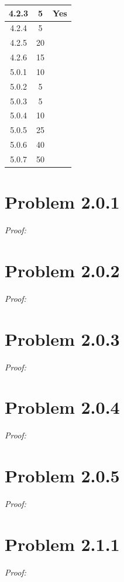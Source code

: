 \documentclass[11pt]{article}
\theoremstyle{definition}
\theoremstyle{remark}
\theoremstyle{problem}
\begin{document}
\begin{center}
\begin{tabular}{|c|c|c|}
4.2.3 & 5 & Yes \\\hline
4.2.4 & 5 & \\\hline
4.2.5 & 20 & \\\hline
4.2.6 & 15 & \\\hline
5.0.1 & 10 & \\\hline
5.0.2 & 5 & \\\hline
5.0.3 & 5 & \\\hline
5.0.4 & 10 & \\\hline
5.0.5 & 25 & \\\hline
5.0.6 & 40 & \\\hline
5.0.7 & 50 & \\\hline
\end{tabular}
\end{center}

\newpage
\tableofcontents
\newpage

\section{Problem 2.0.1}
\textit{Proof:} 
\newpage

\section{Problem 2.0.2}
\textit{Proof:} 
\newpage

\section{Problem 2.0.3}
\textit{Proof:} 
\newpage

\section{Problem 2.0.4}
\textit{Proof:} 
\newpage

\section{Problem 2.0.5}
\textit{Proof:} 
\newpage

\section{Problem 2.1.1}
\textit{Proof:} 
\newpage
\end{document}
